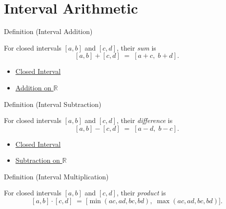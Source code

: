 
\section{Interval Arithmetic}

\begin{definitionbox}{Definition (Interval Addition)}
\begin{definition}\label{def:interval-add}
For closed intervals $[a,b]$ and $[c,d]$, their \emph{sum} is
\[
  [a,b] + [c,d] \;=\; [a+c,\; b+d].
\]
\end{definition}
\end{definitionbox}

\begin{dependencies}
\begin{itemize}
  \item \hyperref[def:closed-interval]{Closed Interval}
  \item \hyperref[def:addition-on-r]{Addition on $\mathbb{R}$}
\end{itemize}
\end{dependencies}

\begin{definitionbox}{Definition (Interval Subtraction)}
\begin{definition}\label{def:interval-sub}
For closed intervals $[a,b]$ and $[c,d]$, their \emph{difference} is
\[
  [a,b] - [c,d] \;=\; [a-d,\; b-c].
\]
\end{definition}
\end{definitionbox}

\begin{dependencies}
\begin{itemize}
  \item \hyperref[def:closed-interval]{Closed Interval}
  \item \hyperref[def:subtraction-on-r]{Subtraction on $\mathbb{R}$}
\end{itemize}
\end{dependencies}

\begin{definitionbox}{Definition (Interval Multiplication)}
\begin{definition}\label{def:interval-mult}
For closed intervals $[a,b]$ and $[c,d]$, their \emph{product} is
\[
  [a,b] \cdot [c,d] \;=\;
  \bigl[\min(ac, ad, bc, bd),\; \max(ac, ad, bc, bd)\bigr].
\]
\end{definition}
\end{definitionbox}

